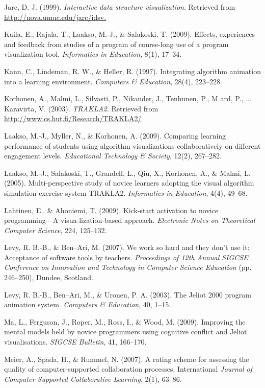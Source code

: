 \begin{chatext}
{Jarc, D. J. (1999). \textit{Interactive data structure visualization}. Retrieved from \url{http://nova.umuc.edu/jarc/idsv.}

Kaila, E., Rajala, T., Laakso, M.-J., \& Salakoski, T. (2009). Effects, experiences and feedback from studies of a program of course-long use of a program visualization tool. \textit{Informatics in Education}, 8(1), 17–34.

Kann, C., Lindeman, R. W., \& Heller, R. (1997). Integrating algorithm animation into a learning environment. \textit{Computers \& Education}, 28(4), 223–228.

Korhonen, A., Malmi, L., Silvasti, P., Nikander, J., Tenhunen, P., M ard, P., ... Karavirta, V. (2003). \textit{TRAKLA2}. Retrieved from \url{http://www.cs.hut.fi/Research/TRAKLA2/}

Laakso, M.-J., Myller, N., \& Korhonen, A. (2009). Comparing learning performance of students using algorithm visualizations collaboratively on different engagement levels. \textit{Educational Technology \& Society}, 12(2), 267–282.

Laakso, M.-J., Salakoski, T., Grandell, L., Qiu, X., Korhonen, A., \& Malmi, L. (2005). Multi-perspective study of novice learners adopting the visual algorithm simulation exercise system TRAKLA2. \textit{Informatics in Education}, 4(4), 49–68.

Lahtinen, E., \& Ahoniemi, T. (2009). Kick-start activation to novice programming—A visua-lization-based approach. \textit{Electronic Notes on Theoretical Computer Science}, 224, 125–132.

Levy, R. B.-B., \& Ben–Ari, M. (2007). We work so hard and they don’t use it: Acceptance of software tools by teachers. \textit{Proceedings of 12th Annual SIGCSE Conference on Innovation and Technology in Computer Science Education} (pp. 246–250), Dundee, Scotland.

Levy, R. B.-B., Ben–Ari, M., \& Uronen, P. A. (2003). The Jeliot 2000 program animation system. \textit{Computers \& Education}, 40, 1–15.

Ma, L., Ferguson, J., Roper, M., Ross, I., \& Wood, M. (2009). Improving the mental models held by novice programmers using cognitive conflict and Jeliot visualisations. \textit{SIGCSE Bulletin}, 41, 166–170.

Meier, A., Spada, H., \& Rummel, N. (2007). A rating scheme for assessing the quality of computer-supported collaboration processes. International \textit{Journal of Computer Supported Collaborative Learning}, 2(1), 63–86.

}
\end{chatext}
